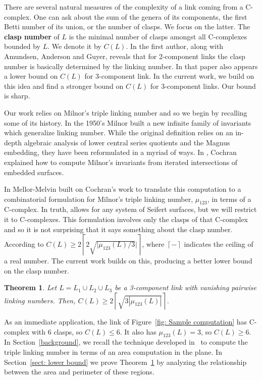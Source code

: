 \documentclass[11pt]{amsart}
\newtheorem{theorem}{Theorem}
\theoremstyle{remark}
\newcommand{\ceil}[1]{\left\lceil #1 \right\rceil}
\begin{document}
There are several natural measures of the complexity of a link coming from a C-complex.  One can ask about the sum of the genera of its components, the first Betti number of its union, or the number of clasps.  We focus on the latter. The \textbf{clasp number} of $L$ is the minimal number of clasps amongst all C-complexes bounded by $L$.  We denote it by $C(L)$.  In \cite[Theorem 2]{AADG20} the first author, along with Amundsen, Anderson and Guyer, reveals that for 2-component links the clasp number is basically determined by the linking number.  In that paper also appears a lower bound on $C(L)$ for 3-component link.    In the current work, we build on this idea and find a stronger bound on $C(L)$ for 3-component links.  Our bound is sharp.  

 Our work relies on Milnor's triple linking number and so we begin by recalling some of its history.  In the 1950's \cite{Milnor1950} Milnor built a new infinite family of invariants which generalize linking number.  While the original definition relies on an in-depth algebraic analysis of lower central series quotients and the Magnus embedding, they have been reformulated in a myriad of ways.  In \cite{CochranBook}, Cochran explained how to compute Milnor's invariants from iterated intersections of embedded surfaces.  

 
 In \cite{MellorMelvin2003} Mellor-Melvin built on Cochran's work to translate this computation to a combinatorial formulation for Milnor's triple linking number, $\mu_{123}$, in terms of a C-complex.  In truth, \cite{MellorMelvin2003} allows for any system of Seifert surfaces, but we will restrict it to C-complexes.  This formulation involves only the clasps of that C-complex and so it is not surprising that it says something about the clasp number.  According to \cite[Theorem 5]{AADG20} $C(L)\ge 2\ceil{2\sqrt{|\mu_{123}(L)/3}|}$, where $\ceil{-}$ indicates the ceiling of a real number.   The current work builds on this, producing a better lower bound on the clasp number.


\begin{theorem}\label{thm: calc} Let \(L=L_1\cup L_2\cup L_3\) be a 3-component link with vanishing pairwise linking numbers. Then, \(C(L)\geq2\ceil{\sqrt{3|\mu_{123}(L)|}}\). 
\end{theorem}

As an immediate application, the link of Figure~\ref{fig: Sample computation} has  C-complex with 6 clasps, so $C(L)\le 6$.   It also has $\mu_{123}(L)=3$, so $C(L)\ge 6$.  In Section~\ref{background}, we recall the technique developed in~\cite{AADG20} to compute the triple linking number in terms of an area computation in the plane.  In Section~\ref{sect: lower bound} we prove Theorem~\ref{thm: calc} by analyzing the relationship between the area and perimeter of these regions.
\end{document}
